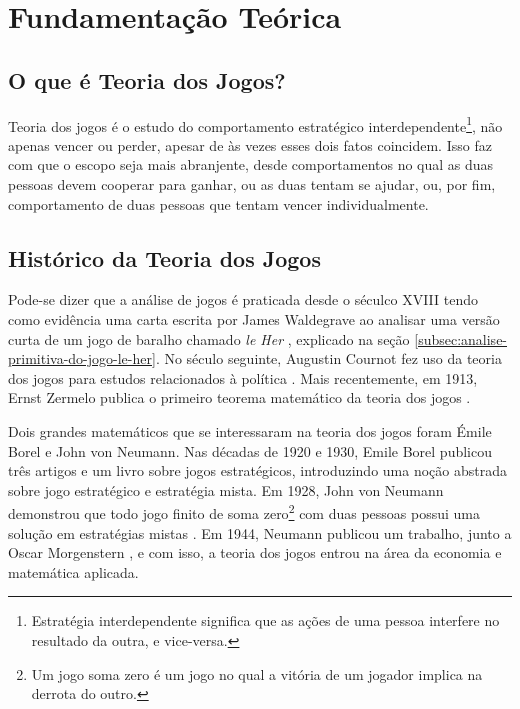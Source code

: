 \chapter[Fundamentação Teórica]{Fundamentação Teórica}
\label{cha:fundamentacao-teorica}

\section{O que é Teoria dos Jogos?}
\label{sec:o-que-e-teoria-dos-jogos}

Teoria dos jogos é o estudo do comportamento estratégico interdependente\footnote{Estratégia interdependente significa que as ações de uma pessoa interfere no resultado da outra, e vice-versa.}, não apenas vencer ou perder, apesar de às vezes esses dois fatos coincidem. Isso faz com que o escopo seja mais abranjente, desde comportamentos no qual as duas pessoas devem cooperar para ganhar, ou as duas tentam se ajudar, ou, por fim, comportamento de duas pessoas que tentam vencer individualmente.

\section{Histórico da Teoria dos Jogos}
\label{sec:historico-da-teoria-dos-jogos}

Pode-se dizer que a análise de jogos é praticada desde o séculco XVIII tendo como evidência uma carta escrita por James Waldegrave ao analisar uma versão curta de um jogo de baralho chamado \emph{le Her} \cite{Prague_severalmilestones}, explicado na seção \ref{subsec:analise-primitiva-do-jogo-le-her}. No século seguinte, Augustin Cournot fez uso da teoria dos jogos para estudos relacionados à política \cite{cournot_1838}. Mais recentemente, em 1913, Ernst Zermelo publica o primeiro teorema matemático da teoria dos jogos \cite{zermelo_1913}.

Dois grandes matemáticos que se interessaram na teoria dos jogos foram Émile Borel e John von Neumann. Nas décadas de 1920 e 1930, Emile Borel publicou três artigos \cite{borel_1921} \cite{borel_1924} \cite{borel_1927} e um livro \cite{borel_1938} sobre jogos estratégicos, introduzindo uma noção abstrada sobre jogo estratégico e estratégia mista. Em 1928, John von Neumann demonstrou que todo jogo finito de soma zero\footnote{Um jogo soma zero é um jogo no qual a vitória de um jogador implica na derrota do outro.} com duas pessoas possui uma solução em estratégias mistas \cite{neumann_1928}. Em 1944, Neumann publicou um trabalho, junto a Oscar Morgenstern \cite{neumann_1944}, e com isso, a teoria dos jogos entrou na área da economia e matemática aplicada.

